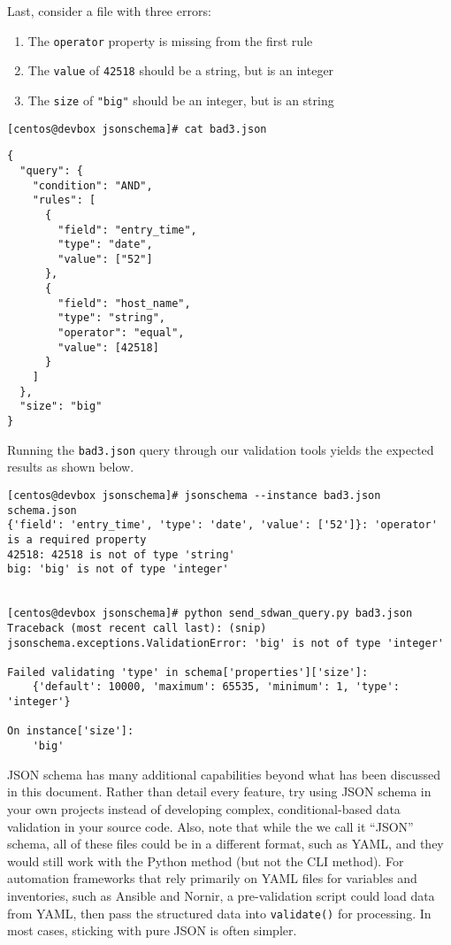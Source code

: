 Last, consider a file with three errors:

\begin{enumerate}
  \item The \verb|operator| property is missing from the first rule
  \item The \verb|value| of \verb|42518| should be a string, but is an integer
  \item The \verb|size| of \verb|"big"| should be an integer, but is an string
\end{enumerate}

\begin{verbatim}
[centos@devbox jsonschema]# cat bad3.json
\end{verbatim}

\begin{verbatim}
{
  "query": {
    "condition": "AND",
    "rules": [
      {
        "field": "entry_time",
        "type": "date",
        "value": ["52"]
      },
      {
        "field": "host_name",
        "type": "string",
        "operator": "equal",
        "value": [42518]
      }
    ]
  },
  "size": "big"
}
\end{verbatim}

Running the \verb|bad3.json| query through our validation tools yields the
expected results as shown below.

\begin{verbatim}
[centos@devbox jsonschema]# jsonschema --instance bad3.json schema.json
{'field': 'entry_time', 'type': 'date', 'value': ['52']}: 'operator' is a required property
42518: 42518 is not of type 'string'
big: 'big' is not of type 'integer'


[centos@devbox jsonschema]# python send_sdwan_query.py bad3.json
Traceback (most recent call last): (snip)
jsonschema.exceptions.ValidationError: 'big' is not of type 'integer'

Failed validating 'type' in schema['properties']['size']:
    {'default': 10000, 'maximum': 65535, 'minimum': 1, 'type': 'integer'}

On instance['size']:
    'big'
\end{verbatim}

JSON schema has many additional capabilities beyond what has been discussed
in this document. Rather than detail every feature, try using JSON schema
in your own projects instead of developing complex, conditional-based data
validation in your source code. Also, note that while the we call it ``JSON''
schema, all of these files could be in a different format, such as YAML,
and they would still work with the Python method (but not the CLI method).
For automation frameworks that rely primarily on YAML files for variables
and inventories, such as Ansible and Nornir, a pre-validation script could
load data from YAML, then pass the structured data into \verb|validate()|
for processing. In most cases, sticking with pure JSON is often simpler.
